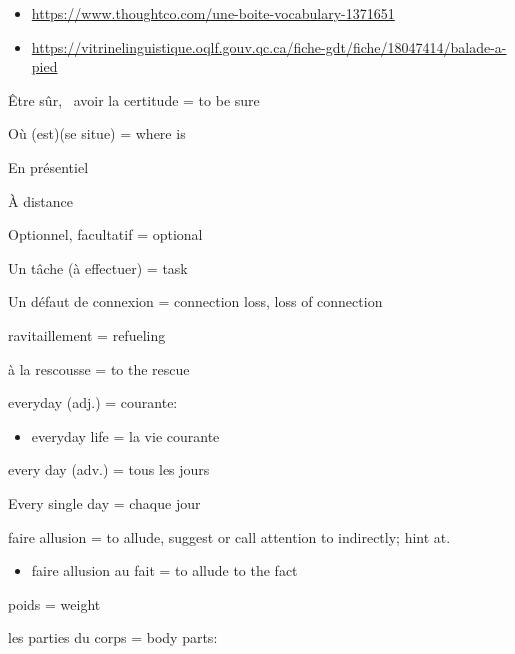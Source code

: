 \protect\hypertarget{2570}{}{}

{}

\begin{itemize}
\item
  \url{https://www.thoughtco.com/une-boite-vocabulary-1371651}
\item
  \url{https://vitrinelinguistique.oqlf.gouv.qc.ca/fiche-gdt/fiche/18047414/balade-a-pied}
\end{itemize}

\hfill\break

\hfill\break

Être sûr,~ avoir la certitude = to be sure~

Où (est)(se situe) = where is

En présentiel~

À distance~

Optionnel, facultatif = optional~

Un tâche (à effectuer) = task

Un défaut de connexion = connection loss, loss of connection~

ravitaillement = refueling

à la rescousse = to the rescue

everyday (adj.) = courante:

\begin{itemize}
\item
  everyday life = la vie courante
\end{itemize}

every day (adv.) = tous les jours

Every single day = chaque jour~

faire allusion = to allude, suggest or call attention to indirectly;
hint at.

\begin{itemize}
\item
  faire allusion au fait = to allude to the fact
\end{itemize}

poids = weight

les parties du corps = body parts:

